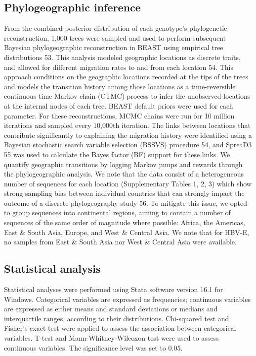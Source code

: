 \subsection{Phylogeographic inference}
From the combined posterior distribution of each genotype's phylogenetic reconstruction, 1,000 trees were sampled and used to perform subsequent Bayesian phylogeographic reconstruction in BEAST using empirical tree distributions 53.
This analysis modeled geographic locations as discrete traits, and allowed for different migration rates to and from each location 54.
This approach conditions on the geographic locations recorded at the tips of the trees and models the transition history among those locations as a time-reversible continuous-time Markov chain (CTMC) process to infer the unobserved locations at the internal nodes of each tree.
BEAST default priors were used for each parameter. For these reconstructions, MCMC chains were run for 10 million iterations and sampled every 10,000th iteration.
The links between locations that contribute significantly to explaining the migration history were identified using a Bayesian stochastic search variable selection (BSSVS) procedure 54, and SpreaD3 55 was used to calculate the Bayes factor (BF) support for these links.
We quantify geographic transitions by logging Markov jumps and rewards through the phylogeographic analysis. We note that the data consist of a heterogeneous number of sequences for each location (Supplementary Tables 1, 2, 3) which show strong sampling bias between individual countries that can strongly impact the outcome of a discrete phylogeography study 56.
To mitigate this issue, we opted to group sequences into continental regions, aiming to contain a number of sequences of the same order of magnitude where possible: Africa, the Americas, East \& South Asia, Europe, and West \& Central Asia.
We note that for HBV-E, no samples from East \& South Asia nor West \& Central Asia were available.

\subsection{Statistical analysis}
Statistical analyses were performed using Stata software version 16.1 for Windows. Categorical variables are expressed as frequencies; continuous variables are expressed as either means and standard deviations or medians and interquartile ranges, according to their distributions. Chi-squared test and Fisher’s exact test were applied to assess the association between categorical variables. T-test and Mann-Whitney-Wilcoxon test were used to assess continuous variables. The significance level was set to 0.05.

